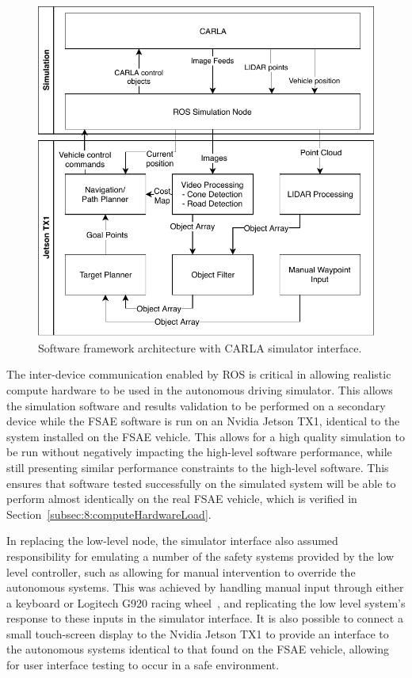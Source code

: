 \begin{figure}[H] 
	\centering
	\includegraphics[width=0.7\columnwidth]{simArchitectureVert}
	\caption{Software framework architecture with CARLA simulator interface.}
	\label{fig:8:simulationArchitecture}
\end{figure}

The inter-device communication enabled by ROS is critical in allowing realistic compute hardware to be used in the autonomous driving simulator.
This allows the simulation software and results validation to be performed on a secondary device while the FSAE software is run on an Nvidia Jetson TX1, identical to the system installed on the FSAE vehicle.
This allows for a high quality simulation to be run without negatively impacting the high-level software performance, while still presenting similar performance constraints to the high-level software.
This ensures that software tested successfully on the simulated system will be able to perform almost identically on the real FSAE vehicle, which is verified in Section~\ref{subsec:8:computeHardwareLoad}.

In replacing the low-level node, the simulator interface also assumed responsibility for emulating a number of the safety systems provided by the low level controller, such as allowing for manual intervention to override the autonomous systems.
This was achieved by handling manual input through either a keyboard or Logitech G920 racing wheel~\cite{logitech_logitech_2019}, and replicating the low level system's response to these inputs in the simulator interface.
It is also possible to connect a small touch-screen display to the Nvidia Jetson TX1 to provide an interface to the autonomous systems identical to that found on the FSAE vehicle, allowing for user interface testing to occur in a safe environment.

